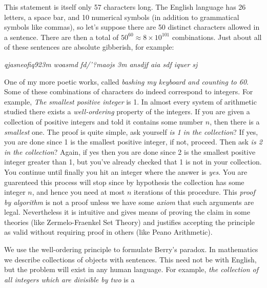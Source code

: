         This statement is itself only 57 characters long. The English language
        has 26 letters, a space bar, and 10 numerical symbols (in addition to
        grammatical symbols like commas), so let's suppose there are 50 distinct
        characters allowed in a sentence. There are then a total of
        $50^{60}\approx{8}\times{10}^{101}$ combinations. Just about all of
        these sentences are absolute gibberish, for example:
        \begin{center}
            \textit{qjasneofiq923m woasmd fd/'?maojs 3m ansdjf aia sdf iquer sj}
        \end{center}
        One of my more poetic works, called
        \textit{bashing my keyboard and counting to 60}. Some of these
        combinations of characters do indeed correspond to integers. For
        example, \textit{The smallest positive integer} is 1. In almost every
        system of arithmetic studied there exists a \textit{well-ordering}%
         property of the integers. If you are given a
        collection of positive integers and told it contains some number $n$,
        then there is a \textit{smallest} one. The proof is quite simple, ask
        yourself \textit{is 1 in the collection}? If yes, you are done since 1
        is the smallest positive integer, if not, proceed. Then ask
        \textit{is 2 in the collection}? Again, if yes then you are done since
        2 is the smallest positive integer greater than 1, but you've already
        checked that 1 is not in your collection. You continue until finally you
        hit an integer where the answer is \textit{yes}. You are guarenteed this
        process will stop since by hypothesis the collection has some integer
        $n$, and hence you need at most $n$ iterations of this procedure. This
        \textit{proof by algorithm} is not a proof unless we have some
        \textit{axiom} that such arguments are legal. Nevertheless it is
        intuitive and gives means of proving the claim in some theories (like
        Zermelo-Fraenkel Set Theory) and justifies accepting the principle as
        valid without requiring proof in others (like Peano Arithmetic).
        \par\hfill\par
        We use the well-ordering principle to formulate Berry's paradox. In
        mathematics we describe collections of objects with sentences. This need
        not be with English, but the problem will exist in any human language.
        For example,
        \textit{the collection of all integers which are divisible by two} is a
